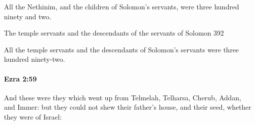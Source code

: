 			\begin{versebox}
					\item[BHS] 
					\item[LXX] 
					\item[ASV] All the Nethinim, and the children of Solomon's servants, were three hundred ninety and two.
					\item[NIV] The temple servants and the descendants of the servants of Solomon 392
					\item[NRSV] All the temple servants and the descendants of Solomon’s servants were three hundred ninety-two.
			\end{versebox}

		\paragraph{Ezra 2:59} %
			\label{EZRA-2-59}

			And these were they which went up from Telmelah, Telharsa, Cherub, Addan, and Immer: but they could not shew their father’s house, and their seed, whether they were of Israel:


